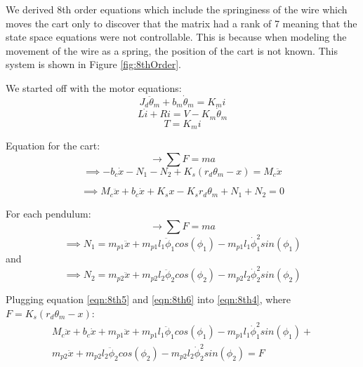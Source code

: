 \documentclass{article}
\begin{document}
We derived 8th order equations which include the springiness of the wire which moves the cart only to discover that the matrix had a rank of 7 meaning that the state space equations were not controllable. This is because when modeling the movement of the wire as a spring, the position of the cart is not known. This system is shown in Figure \ref{fig:8thOrder}.

We started off with the motor equations:
\begin{equation}
J_d \ddot{\theta}_m + b_m \dot{\theta}_m = K_m i
\label{eqn:8th1}
\end{equation}
\begin{equation}
L \dot{i} + R i = V - K_m \dot{\theta}_m
\label{eqn:8th2}
\end{equation}
\begin{equation}
T = K_m i
\label{eqn:8th3}
\end{equation}

Equation for the cart:
\begin{equation*}
\rightarrow \sum{F} = m a
\end{equation*}
\begin{equation*}
\implies -b_c \dot{x} - N_1 - N_2 + K_s (r_d \theta_m - x) = M_c \ddot{x}
\end{equation*}

\begin{equation}
\implies M_c \ddot{x} + b_c \dot{x} + K_s x - K_s r_d \theta_m + N_1 + N_2 = 0
\label{eqn:8th4}
\end{equation}

For each pendulum:
\begin{equation*}
\rightarrow \sum{F} = ma
\end{equation*}
\begin{equation}
\implies N_1 = m_{p1} \ddot{x} + m_{p1} l_1 \ddot{\phi}_1 cos(\phi_1) - m_{p1} l_1 \dot{\phi}_1^2 sin(\phi_1)
\label{eqn:8th5}
\end{equation}
and \begin{equation}
\implies N_2 = m_{p2} \ddot{x} + m_{p2} l_2 \ddot{\phi}_2 cos(\phi_2) - m_{p2} l_2 \dot{\phi}_2^2 sin(\phi_2)
\label{eqn:8th6}
\end{equation}

Plugging equation \ref{eqn:8th5} and \ref{eqn:8th6} into \ref{eqn:8th4}, where $F = K_s ( r_d \theta_m - x )$:
\begin{equation*}
\begin{split}
M_c \ddot{x} + b_c \dot{x} + m_{p1} \ddot{x} + m_{p1} l_1 \ddot{\phi}_1 cos(\phi_1) - m_{p1} l_1 \dot{\phi}_1^2 sin(\phi_1) + \\
m_{p2} \ddot{x} + m_{p2} l_2 \ddot{\phi}_2 cos(\phi_2) - m_{p2} l_2 \dot{\phi}_2^2 sin(\phi_2) = F
\end{split}
\end{equation*}
\end{document}

